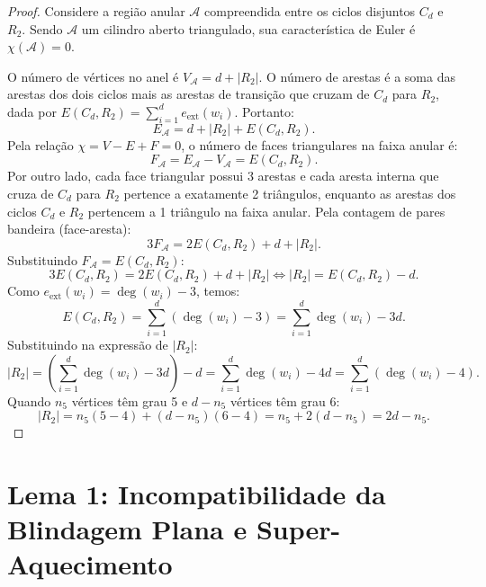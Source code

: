 \documentclass[11pt,a4paper]{article}
\theoremstyle{plain}
\theoremstyle{definition}
\begin{document}
\begin{proof}
Considere a região anular $\mathcal{A}$ compreendida entre os ciclos disjuntos $C_d$ e $R_2$. Sendo $\mathcal{A}$ um cilindro aberto triangulado, sua característica de Euler é $\chi(\mathcal{A}) = 0$. 

O número de vértices no anel é $V_{\mathcal{A}} = d + |R_2|$. O número de arestas é a soma das arestas dos dois ciclos mais as arestas de transição que cruzam de $C_d$ para $R_2$, dada por $E(C_d, R_2) = \sum_{i=1}^d e_{\text{ext}}(w_i)$. Portanto:
\begin{equation}
E_{\mathcal{A}} = d + |R_2| + E(C_d, R_2).
\end{equation}
Pela relação $\chi = V - E + F = 0$, o número de faces triangulares na faixa anular é:
\begin{equation}
F_{\mathcal{A}} = E_{\mathcal{A}} - V_{\mathcal{A}} = E(C_d, R_2).
\end{equation}
Por outro lado, cada face triangular possui 3 arestas e cada aresta interna que cruza de $C_d$ para $R_2$ pertence a exatamente 2 triângulos, enquanto as arestas dos ciclos $C_d$ e $R_2$ pertencem a 1 triângulo na faixa anular. Pela contagem de pares bandeira (face-aresta):
\begin{equation}
3 F_{\mathcal{A}} = 2 E(C_d, R_2) + d + |R_2|.
\end{equation}
Substituindo $F_{\mathcal{A}} = E(C_d, R_2)$:
\begin{equation}
3 E(C_d, R_2) = 2 E(C_d, R_2) + d + |R_2| \iff |R_2| = E(C_d, R_2) - d.
\end{equation}
Como $e_{\text{ext}}(w_i) = \deg(w_i) - 3$, temos:
\begin{equation}
E(C_d, R_2) = \sum_{i=1}^d (\deg(w_i) - 3) = \sum_{i=1}^d \deg(w_i) - 3d.
\end{equation}
Substituindo na expressão de $|R_2|$:
\begin{equation}
|R_2| = \left( \sum_{i=1}^d \deg(w_i) - 3d \right) - d = \sum_{i=1}^d \deg(w_i) - 4d = \sum_{i=1}^d (\deg(w_i) - 4).
\end{equation}
Quando $n_5$ vértices têm grau 5 e $d - n_5$ vértices têm grau 6:
\begin{equation}
|R_2| = n_5 (5 - 4) + (d - n_5)(6 - 4) = n_5 + 2(d - n_5) = 2d - n_5.
\end{equation}
\end{proof}

\section{Lema 1: Incompatibilidade da Blindagem Plana e Super-Aquecimento}
\end{document}
